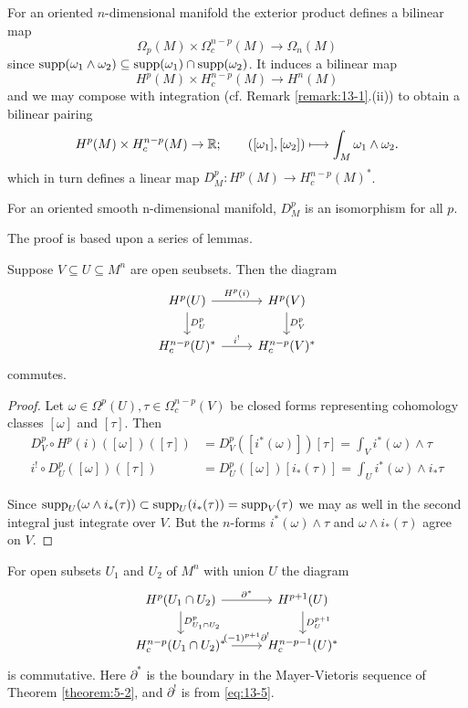 For an oriented $n$-dimensional manifold the exterior product defines a bilinear map
\[
  \Omega_p(M)\times\Omega_c^{n-p}(M)\to\Omega_n(M)
\]
since $\operatorname{supp}(\omega_1\wedge\omega_2)\subseteq\operatorname{supp}(\omega_1)\cap\operatorname{supp}(\omega_2)$. It induces a bilinear map 
\[
  H^p(M)\times H_c^{n-p}(M)\to H^n(M)
\]
and we may compose with integration (cf. Remark \ref{remark:13-1}.(ii)) to obtain a bilinear
pairing
\[
  H^p(M)\times H_c^{n-p}(M)\to{\ensuremath{\mathbb{R}}};\qquad ([\omega_1], [\omega_2])\longmapsto\int_M\omega_1\wedge\omega_2.
\]
which in turn defines a linear map $D_M^p:H^p(M)\to H_c^{n-p}(M)^*$.

\begin{theorem}\label{theorem:13-5}
  For an oriented smooth n-dimensional manifold, $D_M^p$ is an isomorphism for all $p$.
\end{theorem}

The proof is based upon a series of lemmas.

\begin{lemma}\label{lemma:13-6}
  Suppose $V\subseteq U\subseteq M^n$ are open seubsets. Then the diagram
  \[\begin{tikzcd}
    H^p(U) \arrow[r, "H^p(i)"] \arrow[d, "D_U^p"] &  H^p(V)\arrow[d, "D_V^p"] \\
    H_c^{n-p}(U)^* \arrow[r, "i^!"] & H_c^{n-p}(V)^*
  \end{tikzcd}\]
  commutes.
\end{lemma}

\begin{proof}
  Let $\omega\in\Omega^p(U), \tau\in\Omega_c^{n-p}(V)$ be closed forms representing cohomology classes $[\omega]$ and 
  $[\tau]$. Then 
  \begin{align*}
    D_V^p\circ H^p(i)([\omega])([\tau]) & = D_V^p([i^*(\omega)])[\tau]  = \int_V i^*(\omega)\wedge\tau\\
    i^!\circ D_U^p([\omega])([\tau]) & = D_U^p([\omega])[i_*(\tau)]     = \int_U i^*(\omega)\wedge i_*\tau
  \end{align*}
  
  Since $\operatorname{supp}_U(\omega\wedge i_*(\tau))\subset\operatorname{supp}_U(i_*(\tau))=\operatorname{supp}_V(\tau)$ we may as well in the second integral
  just integrate over $V$. But the $n$-forms $i^*(\omega)\wedge\tau$ and $\omega\wedge i_*(\tau)$ agree on $V$.
\end{proof}

\begin{lemma}\label{lemma:13-7}
  For open subsets $U_1$ and $U_2$ of $M^n$ with union $U$ the diagram
  \[\begin{tikzcd}
    H^p(U_1\cap U_2)\arrow[d, "D_{U_1\cap U_2}^p"]\arrow[r, "\partial^*"] & H^{p+1}(U)\arrow[d, "D_U^{p+1}"]\\
    H_c^{n-p}(U_1\cap U_2)^*\arrow[r, "(-1)^{p+1}\partial^!"] & H_c^{n-p-1}(U)^*
  \end{tikzcd}\]
  is commutative. Here $\partial^*$ is the boundary in the Mayer-Vietoris sequence of Theorem \ref{theorem:5-2}, and 
  $\partial^!$ is from \eqref{eq:13-5}.
\end{lemma}

